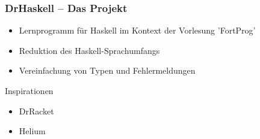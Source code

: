 \begin{frame}
	\frametitle{DrHaskell -- Das Projekt}
	\begin{itemize}
		\item Lernprogramm für Haskell im Kontext der Vorlesung 'FortProg' \pause
		\item Reduktion des Haskell-Sprachumfangs \pause
		\item Vereinfachung von Typen und Fehlermeldungen \pause
	\end{itemize}
	\vspace{1em}\pause
	Inspirationen \pause
	\begin{itemize}
		\item DrRacket \pause
		\item Helium
	\end{itemize}
\end{frame}